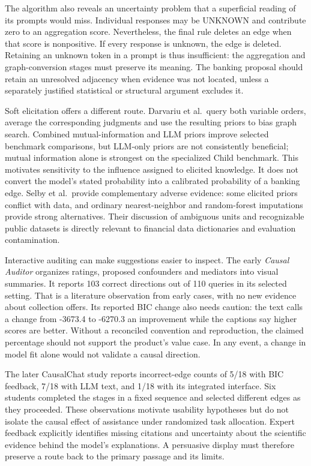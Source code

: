 The algorithm also reveals an uncertainty problem that a superficial
reading of its prompts would miss. Individual responses may be UNKNOWN
and contribute zero to an aggregation score. Nevertheless, the final
rule deletes an edge when that score is nonpositive. If every response
is unknown, the edge is deleted. Retaining an unknown token in a prompt
is thus insufficient: the aggregation and graph-conversion stages must
preserve its meaning. The banking proposal should retain an unresolved
adjacency when evidence was not located, unless a separately justified
statistical or structural argument excludes it.
\citep{v12_la_2402_15301}

Soft elicitation offers a different route. Darvariu et al.~query both
variable orders, average the corresponding judgments and use the
resulting priors to bias graph search. Combined mutual-information and
LLM priors improve selected benchmark comparisons, but LLM-only priors
are not consistently beneficial; mutual information alone is strongest
on the specialized Child benchmark. This motivates sensitivity to the
influence assigned to elicited knowledge. It does not convert the
model's stated probability into a calibrated probability of a banking
edge. Selby et al.~provide complementary adverse evidence: some elicited
priors conflict with data, and ordinary nearest-neighbor and
random-forest imputations provide strong alternatives. Their discussion
of ambiguous units and recognizable public datasets is directly relevant
to financial data dictionaries and evaluation contamination.
\citep{v12_la_2405_13551,v12_la_2402_07770}

Interactive auditing can make suggestions easier to inspect. The early
\emph{Causal Auditor} organizes ratings, proposed confounders and
mediators into visual summaries. It reports 103 correct directions out
of 110 queries in its selected setting. That is a literature observation
from early cases, with no new evidence about collection offers. Its
reported BIC change also needs caution: the text calls a change from
-3673.4 to -6270.3 an improvement while the captions say higher scores
are better. Without a reconciled convention and reproduction, the
claimed percentage should not support the product's value case. In any
event, a change in model fit alone would not validate a causal
direction. \citep{exec14_expert_auditor}

The later CausalChat study reports incorrect-edge counts of 5/18 with
BIC feedback, 7/18 with LLM text, and 1/18 with its integrated
interface. Six students completed the stages in a fixed sequence and
selected different edges as they proceeded. These observations motivate
usability hypotheses but do not isolate the causal effect of assistance
under randomized task allocation. Expert feedback explicitly identifies
missing citations and uncertainty about the scientific evidence behind
the model's explanations. A persuasive display must therefore preserve a
route back to the primary passage and its limits.
\citep{v12_la_2410_14146}

